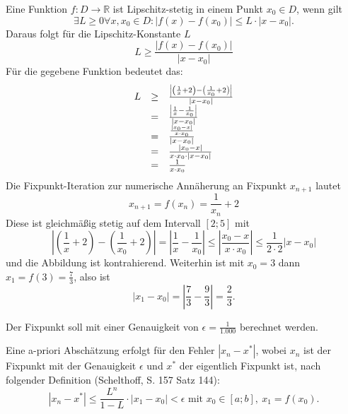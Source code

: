 \documentclass[main.tex]{subfiles}
\begin{document}
Eine Funktion $f:D\rightarrow \mathbb{R}$ ist Lipschitz-stetig in einem Punkt $x_{0} \in D$, wenn gilt
\begin{equation*}
    \exists L\geq 0\forall x,x_{0} \in D:| f( x) -f( x_{0})| \leq L\cdot | x-x_{0}| \text{.}
\end{equation*}
Daraus folgt für die Lipschitz-Konstante $L$
\begin{equation*}
    L\geq \frac{| f( x) -f( x_{0})| }{| x-x_{0}| }
\end{equation*}
Für die gegebene Funktion bedeutet das:
\begin{equation*}
    \begin{array}{ c c l }
    L & \geq  & \frac{\left| \left(\frac{1}{x} +2\right) -\left(\frac{1}{x_{0}} +2\right)\right| }{| x-x_{0}| }\\
    & = & \frac{\left| \frac{1}{x} -\frac{1}{x_{0}}\right| }{| x-x_{0}| }\\
    & = & \frac{\frac{| x_{0} -x| }{x\cdot x_{0}}}{| x-x_{0}| }\\
    & = & \frac{| x_{0} -x| }{x\cdot x_{0} \cdot | x-x_{0}| }\\
    & = & \frac{1}{x\cdot x_{0}}
    \end{array}
\end{equation*}
Die Fixpunkt-Iteration zur numerische Annäherung an Fixpunkt $x_{n+1}$ lautet
\begin{equation*}
    x_{n+1} =f( x_{n}) =\frac{1}{x_{n}} +2
\end{equation*}
Diese ist gleichmäßig stetig auf dem Intervall $\displaystyle [ 2;5]$ mit
\begin{equation*}
    \left| \left(\frac{1}{x} +2\right) -\left(\frac{1}{x_{0}} +2\right)\right| =\left| \frac{1}{x} -\frac{1}{x_{0}}\right| \leq \left| \frac{x_{0} -x}{x\cdot x_{0}}\right| \leq \frac{1}{2\cdot 2}| x-x_{0}| 
\end{equation*}
und die Abbildung ist kontrahierend. Weiterhin ist mit $x_{0} =3$ dann $x_{1} =f( 3) =\frac{7}{3}$, also ist
\begin{equation*}
    | x_{1} -x_{0}| =\left| \frac{7}{3} -\frac{9}{3}\right| =\frac{2}{3}\text{.}
\end{equation*}

Der Fixpunkt soll mit einer Genauigkeit von $\epsilon =\frac{1}{1.000}$ berechnet werden.

Eine a-priori Abschätzung erfolgt für den Fehler $\left| x_{n} -x^{*}\right| $, wobei $x_{n}$ ist der Fixpunkt mit der Genauigkeit $\epsilon $ und $x^{*}$ der eigentlich Fixpunkt ist, nach folgender Definition (Schelthoff, S. 157 Satz 144):
\begin{equation*}
    \left| x_{n} -x^{*}\right| \leq \frac{L^{n}}{1-L} \cdotp | x_{1} -x_{0}| < \epsilon \text{ mit } x_{0} \in [a;b] ,\ x_{1} =f( x_{0})\text{.}
\end{equation*}
\end{document}
